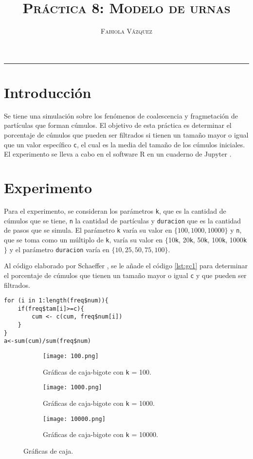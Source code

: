 \documentclass[12pt,letterpaper]{article}
\title{\textsc{Práctica 8: Modelo de urnas}}
\author{\textsc{Fabiola Vázquez}}
\begin{document}
\maketitle

\hrule
\section{Introducción}
Se tiene una simulación sobre los fenómenos de coalescencia y fragmetación de partículas que forman cúmulos. El objetivo de esta práctica \cite{elisapractica8} es determinar el porcentaje de cúmulos que pueden ser filtrados si tienen un tamaño mayor o igual que un valor específico \texttt{c}, el cual es la media del tamaño de los cúmulos iniciales. El experimento se lleva a cabo en el software R \cite{R} en un cuaderno de Jupyter \cite{jupyter}.

\section{Experimento}
Para el experimento, se consideran los parámetros \texttt{k}, que es la cantidad de cúmulos que se tiene, \texttt{n} la cantidad de partículas y \texttt{duracion} que es la cantidad de pasos que se simula. El parámetro \texttt{k} varía su valor en $\{100, 1000, 10000\}$ y \texttt{n}, que se toma como un múltiplo de \texttt{k}, varía su valor en $\{$10\texttt{k}, 20\texttt{k}, 50\texttt{k}, 100\texttt{k}, 1000\texttt{k}$\}$ y el parámetro \texttt{duracion} varía en $\{10, 25, 50, 75, 100\}$.

Al código elaborado por Schaeffer \cite{codigoelisapractica8}, se le añade el código \ref{lst:gc1} para determinar el porcentaje de cúmulos que tienen un tamaño mayor o igual \texttt{c} y que pueden ser filtrados.

\begin{lstlisting}[label=lst:gc1,caption=Cálculo del porcentaje de cúmulos filtrados., frame = single]
for (i in 1:length(freq$num)){
	if(freq$tam[i]>=c){
		cum <- c(cum, freq$num[i])
    }
}
a<-sum(cum)/sum(freq$num)
\end{lstlisting} 

\begin{figure}
 	\centering
 	\begin{subfigure}[b]{0.7\linewidth}
 		\texttt{[image: 100.png]}
 		 \caption{Gráficas de caja-bigote con \texttt{k} = 100.}
 		\label{100}
 	\end{subfigure}
 	\begin{subfigure}[b]{0.7\linewidth}
 		\texttt{[image: 1000.png]}
 		 \caption{Gráficas de caja-bigote con \texttt{k} = 1000.}
 		\label{1000}
 	\end{subfigure}
  	\begin{subfigure}[b]{0.7\linewidth}
 		\texttt{[image: 10000.png]}
 		 \caption{Gráficas de caja-bigote con \texttt{k} = 10000.}
 		\label{10000}
 	\end{subfigure}
 	\caption{Gráficas de caja.}  	
\label{graficas}
 \end{figure}
\end{document}
